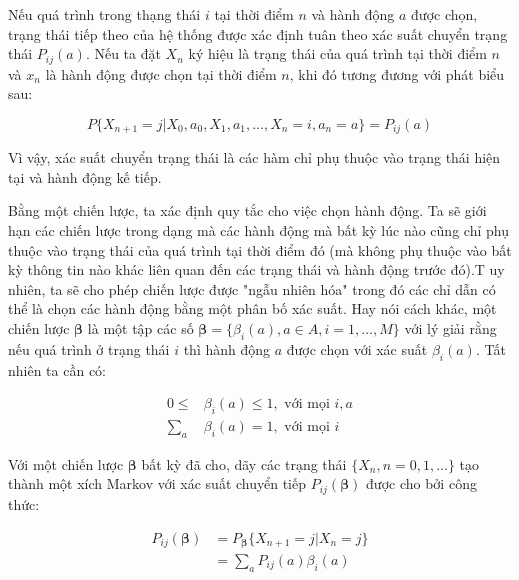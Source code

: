 \documentclass[14pt, a4paper]{article}
\numberwithin{equation}{section}
\numberwithin{figure}{section}
\theoremstyle{sltheorem}
\theoremstyle{soltheorem}
\numberwithin{dl}{section}
\numberwithin{md}{section}
\numberwithin{vd}{section}
\begin{document}
    Nếu quá trình trong thạng thái $i$ tại thời điểm $n$ và hành động $a$ được chọn, trạng thái tiếp theo của hệ thống được xác định tuân theo xác suất chuyển trạng thái $P_{ij}(a)$.
    Nếu ta đặt $X_n$ ký hiệu là trạng thái của quá trình tại thời điểm $n$ và $x_n$ là hành động được chọn tại thời điểm $n$, khi đó tương đương với phát biểu sau:

    \begin{equation*}
        P \lbrace X_{n+1} = j \vert X_0, a_0, X_1, a_1, \dots, X_n = i, a_n = a \rbrace = P_{ij}(a)
    \end{equation*}

    Vì vậy, xác suất chuyển trạng thái là các hàm chỉ phụ thuộc vào trạng thái hiện tại và hành động kế tiếp.

    Bằng một chiến lược, ta xác định quy tắc cho việc chọn hành động.
    Ta sẽ giới hạn các chiến lược trong dạng mà các hành động mà bất kỳ lúc nào cũng chỉ phụ thuộc vào trạng thái của quá trình tại thời điểm đó (mà không phụ thuộc vào bất kỳ thông tin nào khác liên quan đến các trạng thái và hành động trước đó).T
    uy nhiên, ta sẽ cho phép chiến lược được "ngẫu nhiên hóa" trong đó các chỉ dẫn có thể là chọn các hành động bằng một phân bố xác suất.
    Hay nói cách khác, một chiến lược $\boldsymbol{\beta}$ là một tập các số $\boldsymbol{\beta}=\lbrace \beta_i (a), a \in A, i = 1, \dots, M \rbrace$ với lý giải rằng nếu quá trình ở trạng thái $i$ thì hành động $a$ được chọn với xác suất $\beta_i (a)$.
    Tất nhiên ta cần có:

    \begin{equation*}
        \begin{aligned}
            0 \leq &\beta_i (a) \leq 1, \text{ với mọi } i, a \\
            \sum_{a} &\beta_i(a) = 1, \text{ với mọi } i
        \end{aligned}
    \end{equation*}

    Với một chiến lược $\boldsymbol{\beta}$ bất kỳ đã cho, dãy các trạng thái $\lbrace X_n, n = 0, 1, \dots \rbrace$ tạo thành một xích Markov với xác suất chuyển tiếp $P_{ij} (\boldsymbol{\beta})$ được cho bởi công thức:

    \begin{equation*}
        \begin{aligned}
            P_{ij} (\boldsymbol{\beta}) &= P_{\boldsymbol{\beta}} \lbrace X_{n+1} = j \vert X_n = j \rbrace \\
            &= \sum_{a} P_{ij}(a)\beta_i (a)
        \end{aligned}
    \end{equation*}
\end{document}

